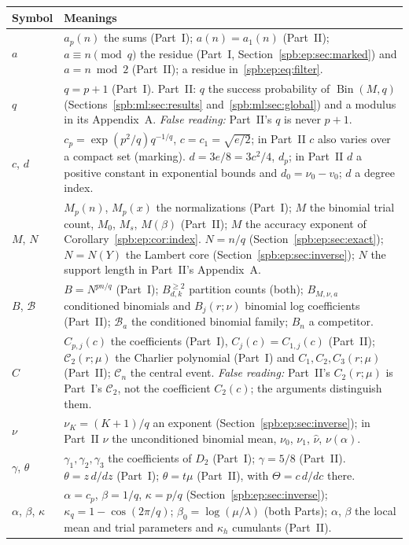 \documentclass[11pt,letterpaper]{article}
\numberwithin{equation}{section}
\theoremstyle{definition}\newtheorem{definition}[theorem]{Definition}
\theoremstyle{remark}\newtheorem{remark}[theorem]{Remark}
\newcommand{\1}{\mathbf 1}
\newcommand{\Bin}{\operatorname{Bin}}
\begin{document}
\noindent\begin{longtable}{@{}>{\raggedright\arraybackslash}p{0.75in}>{\raggedright\arraybackslash}p{5.45in}@{}}
\toprule
Symbol & Meanings\\
\midrule
\endhead
$a$ & $a_p(n)$ the sums (Part~I); $a(n)=a_1(n)$ (Part~II); $a\equiv n\pmod q$ the residue (Part~I, Section~\ref{spb:ep:sec:marked}) and $a=n\bmod2$ (Part~II); a residue in~\eqref{spb:ep:eq:filter}.\\
$q$ & $q=p+1$ (Part~I). Part~II: $q$ the success probability of $\Bin(M,q)$ (Sections~\ref{spb:ml:sec:results} and~\ref{spb:ml:sec:global}) and a modulus in its Appendix~A. \emph{False reading:} Part~II's $q$ is never $p+1$.\\
$c$, $d$ & $c_p=\exp(p^2/q)q^{-1/q}$, $c=c_1=\sqrt{e/2}$; in Part~II $c$ also varies over a compact set (marking). $d=3e/8=3c^2/4$, $d_p$; in Part~II $d$ a positive constant in exponential bounds and $d_0=\nu_0-v_0$; $d$ a degree index.\\
$M$, $N$ & $M_p(n)$, $M_p(x)$ the normalizations (Part~I); $M$ the binomial trial count, $M_0$, $M_s$, $M(\beta)$ (Part~II); $M$ the accuracy exponent of Corollary~\ref{spb:ep:cor:index}. $N=n/q$ (Section~\ref{spb:ep:sec:exact}); $N=N(Y)$ the Lambert core (Section~\ref{spb:ep:sec:inverse}); $N$ the support length in Part~II's Appendix~A.\\
$B$, $\mathcal B$ & $B=N^{pn/q}$ (Part~I); $B^{\ge2}_{d,k}$ partition counts (both); $B_{M,\nu,a}$ conditioned binomials and $B_j(r;\nu)$ binomial log coefficients (Part~II); $\mathcal B_a$ the conditioned binomial family; $B_n$ a competitor.\\
$C$ & $C_{p,j}(c)$ the coefficients (Part~I), $C_j(c)=C_{1,j}(c)$ (Part~II); $\mathcal C_2(r;\mu)$ the Charlier polynomial (Part~I) and $C_1,C_2,C_3(r;\mu)$ (Part~II); $\mathcal C_n$ the central event. \emph{False reading:} Part~II's $C_2(r;\mu)$ is Part~I's $\mathcal C_2$, not the coefficient $C_2(c)$; the arguments distinguish them.\\
$\nu$ & $\nu_K=(K+1)/q$ an exponent (Section~\ref{spb:ep:sec:inverse}); in Part~II $\nu$ the unconditioned binomial mean, $\nu_0$, $\nu_1$, $\widehat\nu$, $\nu(\alpha)$.\\
$\gamma$, $\theta$ & $\gamma_1,\gamma_2,\gamma_3$ the coefficients of $D_2$ (Part~I); $\gamma=5/8$ (Part~II). $\theta=z\,d/dz$ (Part~I); $\theta=t\mu$ (Part~II), with $\Theta=c\,d/dc$ there.\\
$\alpha$, $\beta$, $\kappa$ & $\alpha=c_p$, $\beta=1/q$, $\kappa=p/q$ (Section~\ref{spb:ep:sec:inverse}); $\kappa_q=1-\cos(2\pi/q)$; $\beta_0=\log(\mu/\lambda)$ (both Parts); $\alpha$, $\beta$ the local mean and trial parameters and $\kappa_h$ cumulants (Part~II).\\

\end{longtable}
\end{document}
